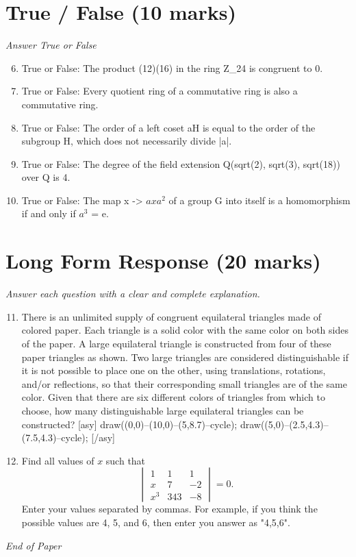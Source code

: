 \documentclass[12pt]{article}
\begin{document}
\section*{True / False (10 marks)}
\textit{Answer True or False}
\begin{enumerate}[label=\arabic*.]
\setcounter{enumi}{5}
\item True or False: The product (12)(16) in the ring Z\_24 is congruent to 0.
\item True or False: Every quotient ring of a commutative ring is also a commutative ring.
\item True or False: The order of a left coset aH is equal to the order of the subgroup H, which does not necessarily divide |a|.
\item True or False: The degree of the field extension Q(sqrt(2), sqrt(3), sqrt(18)) over Q is 4.
\item True or False: The map x -\textgreater{} $axa^2$ of a group G into itself is a homomorphism if and only if $a^3$ = e.
\end{enumerate}

\section*{Long Form Response (20 marks)}
\textit{Answer each question with a clear and complete explanation.}
\begin{enumerate}[label=\arabic*.]
\setcounter{enumi}{10}
\item There is an unlimited supply of congruent equilateral triangles made of colored paper. Each triangle is a solid color with the same color on both sides of the paper. A large equilateral triangle is constructed from four of these paper triangles as shown. Two large triangles are considered distinguishable if it is not possible to place one on the other, using translations, rotations, and/or reflections, so that their corresponding small triangles are of the same color. Given that there are six different colors of triangles from which to choose, how many distinguishable large equilateral triangles can be constructed? [asy] draw((0,0)--(10,0)--(5,8.7)--cycle); draw((5,0)--(2.5,4.3)--(7.5,4.3)--cycle); [/asy]
\item Find all values of $x$ such that \[ \begin{vmatrix} 1 & 1 & 1 \\ x & 7 & -2 \\ x^3 & 343 & -8 \end{vmatrix} = 0.\]Enter your values separated by commas. For example, if you think the possible values are 4, 5, and 6, then enter you answer as "4,5,6".
\end{enumerate}

\vfill
\noindent\textit{End of Paper}
\end{document}
